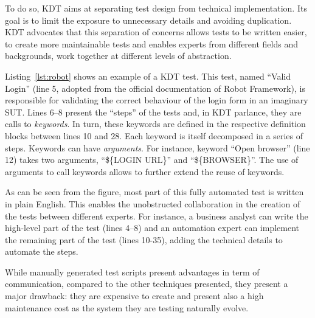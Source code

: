 To do so, KDT\cite{Tang2008, Hametner2012} aims at separating test design from technical implementation. Its goal is to limit the exposure to unnecessary details and avoiding duplication. KDT advocates that this separation of concerns allows tests to be written easier, to create more maintainable tests and enables experts from different fields and backgrounds, work together at different levels of abstraction. 

Listing~\ref{lst:robot} shows an example of a KDT test. This test, named ``Valid Login'' (line 5, adopted from the official documentation of Robot Framework), is responsible for validating the correct behaviour of the login form in an imaginary SUT. Lines 6--8 present the ``steps'' of the tests and, in KDT parlance, they are calls to \emph{keywords}. In turn, these keywords are defined in the respective definition blocks between lines 10 and 28. Each keyword is itself decomposed in a series of steps. Keywords can have \emph{arguments}. For instance, keyword ``Open browser'' (line 12) takes two arguments, ``\$\{LOGIN URL\}'' and ``\$\{BROWSER\}''. The use of arguments to call keywords allows to further extend the reuse of keywords.

As can be seen from the figure, most part of this fully automated test is written in plain English. This enables the unobstructed collaboration in the creation of the tests between different experts. For instance, a business analyst can write the high-level part of the test (lines 4--8) and an automation expert can implement the remaining part of the test (lines 10-35), adding the technical details to automate the steps.

While manually generated test scripts present advantages in term of communication, compared to the other techniques presented, they present a major drawback: they are expensive to create and present also a high maintenance cost as the system they are testing naturally evolve.

